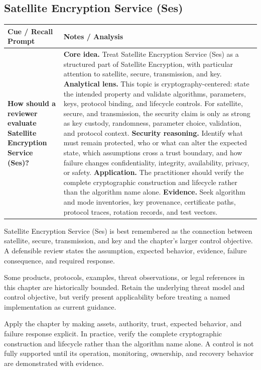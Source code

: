 \documentclass[11pt]{article}
\newcommand{\CornellHeader}{%
\rowcolor{Navy}\color{white}\bfseries Cue / Recall Prompt & \color{white}\bfseries Notes / Analysis\\\hline}
\newcommand{\CornellRow}[2]{%
\cellcolor{CueGray}\RaggedRight\textbf{#1} & \RaggedRight #2\\\hline}
\begin{document}
\subsection*{Satellite Encryption Service (Ses)}
\begin{longtable}{>{\RaggedRight\arraybackslash}p{}|>{\RaggedRight\arraybackslash}p{}}
\CornellHeader
\CornellRow{How should a reviewer evaluate Satellite Encryption Service (Ses)?}{\textbf{Core idea.} Treat Satellite Encryption Service (Ses) as a structured part of Satellite Encryption, with particular attention to satellite, secure, transmission, and key. \textbf{Analytical lens.} This topic is cryptography-centered: state the intended property and validate algorithms, parameters, keys, protocol binding, and lifecycle controls. For satellite, secure, and transmission, the security claim is only as strong as key custody, randomness, parameter choice, validation, and protocol context. \textbf{Security reasoning.} Identify what must remain protected, who or what can alter the expected state, which assumptions cross a trust boundary, and how failure changes confidentiality, integrity, availability, privacy, or safety. \textbf{Application.} The practitioner should verify the complete cryptographic construction and lifecycle rather than the algorithm name alone. \textbf{Evidence.} Seek algorithm and mode inventories, key provenance, certificate paths, protocol traces, rotation records, and test vectors.}
\end{longtable}
\begin{topicsummary}
Satellite Encryption Service (Ses) is best remembered as the connection between satellite, secure, transmission, and key and the chapter's larger control objective. A defensible review states the assumption, expected behavior, evidence, failure consequence, and required response.
\end{topicsummary}
\begin{historybox}
Some products, protocols, examples, threat observations, or legal references in this chapter are historically bounded. Retain the underlying threat model and control objective, but verify present applicability before treating a named implementation as current guidance.
\end{historybox}
\begin{defensebox}
Apply the chapter by making assets, authority, trust, expected behavior, and failure response explicit. In practice, verify the complete cryptographic construction and lifecycle rather than the algorithm name alone. A control is not fully supported until its operation, monitoring, ownership, and recovery behavior are demonstrated with evidence.
\end{defensebox}
\end{document}
